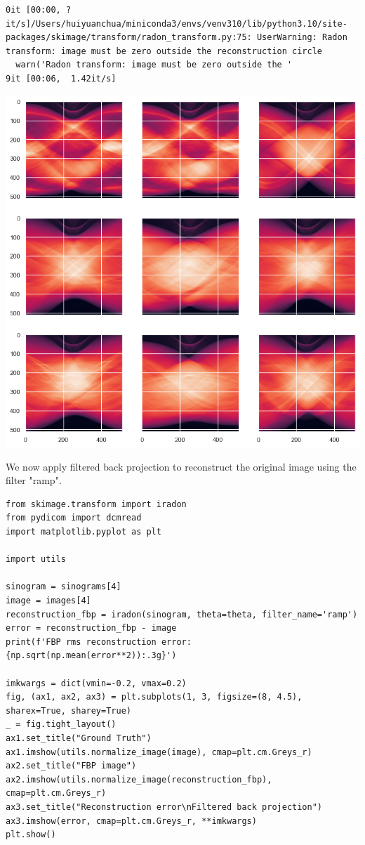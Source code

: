 \documentclass[a4paper, 11pt]{article}
\begin{document}
\begin{verbatim}
0it [00:00, ?it/s]/Users/huiyuanchua/miniconda3/envs/venv310/lib/python3.10/site-packages/skimage/transform/radon_transform.py:75: UserWarning: Radon transform: image must be zero outside the reconstruction circle
  warn('Radon transform: image must be zero outside the '
9it [00:06,  1.42it/s]

\end{verbatim}

\begin{center}
\includegraphics[width=.9\linewidth]{./.ob-jupyter/9908590d1629c61ffc91bfa8d539c672a7a6b737.png}
\end{center}

We now apply filtered back projection to reconstruct the original image using the filter "ramp".
\begin{verbatim}
from skimage.transform import iradon
from pydicom import dcmread
import matplotlib.pyplot as plt

import utils

sinogram = sinograms[4]
image = images[4]
reconstruction_fbp = iradon(sinogram, theta=theta, filter_name='ramp')
error = reconstruction_fbp - image
print(f'FBP rms reconstruction error: {np.sqrt(np.mean(error**2)):.3g}')

imkwargs = dict(vmin=-0.2, vmax=0.2)
fig, (ax1, ax2, ax3) = plt.subplots(1, 3, figsize=(8, 4.5), sharex=True, sharey=True)
_ = fig.tight_layout()
ax1.set_title("Ground Truth")
ax1.imshow(utils.normalize_image(image), cmap=plt.cm.Greys_r)
ax2.set_title("FBP image")
ax2.imshow(utils.normalize_image(reconstruction_fbp), cmap=plt.cm.Greys_r)
ax3.set_title("Reconstruction error\nFiltered back projection")
ax3.imshow(error, cmap=plt.cm.Greys_r, **imkwargs)
plt.show()
\end{verbatim}
\end{document}
